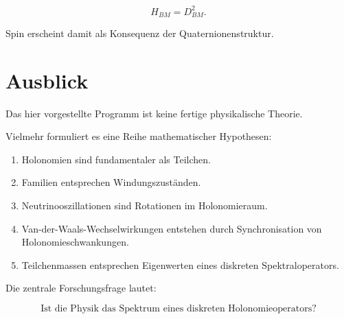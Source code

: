 \documentclass[11pt,a4paper]{article}
\begin{document}
	\[
	H_{BM}
	=
	D_{BM}^2.
	\]
	
	Spin erscheint damit
	als Konsequenz der Quaternionenstruktur.
	
	\section{Ausblick}
	
	Das hier vorgestellte Programm
	ist keine fertige physikalische Theorie.
	
	Vielmehr formuliert es eine Reihe mathematischer Hypothesen:
	
	\begin{enumerate}
		\item Holonomien sind fundamentaler als Teilchen.
		\item Familien entsprechen Windungszuständen.
		\item Neutrinooszillationen sind Rotationen im Holonomieraum.
		\item Van-der-Waals-Wechselwirkungen entstehen durch
		Synchronisation von Holonomieschwankungen.
		\item Teilchenmassen entsprechen Eigenwerten
		eines diskreten Spektraloperators.
	\end{enumerate}
	
	Die zentrale Forschungsfrage lautet:
	
	\[
	\boxed{
		\text{Ist die Physik das Spektrum eines diskreten Holonomieoperators?}
	}
	\]
	
\end{document}
